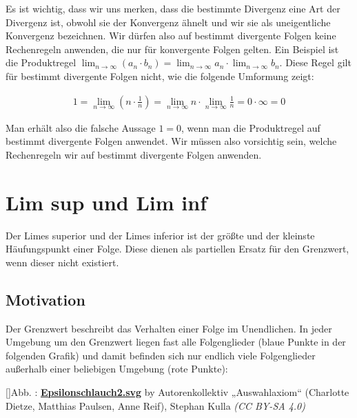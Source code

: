 \documentclass[fontsize=9pt,
               parskip=half-,
               DIV=14,
               listof=chapterentry,
               tocflat]{scrbook}
\newcounter{imagelabel}
\begin{document}
\begin{warning*}
Es ist wichtig, dass wir uns merken, dass die bestimmte Divergenz eine Art der Divergenz ist, obwohl sie der Konvergenz ähnelt und wir sie als uneigentliche Konvergenz bezeichnen. Wir dürfen also auf bestimmt divergente Folgen keine Rechenregeln anwenden, die nur für konvergente Folgen gelten. Ein Beispiel ist die Produktregel $\lim _{n\to \infty }(a_{n}\cdot b_{n})=\lim _{n\to \infty }a_{n}\cdot \lim _{n\to \infty }b_{n}$. Diese Regel gilt für bestimmt divergente Folgen nicht, wie die folgende Umformung zeigt:

\begin{align*}
1=\lim _{n\to \infty }\left(n\cdot {\frac {1}{n}}\right)=\lim _{n\to \infty }n\cdot \lim _{n\to \infty }{\frac {1}{n}}=0\cdot \infty =0
\end{align*}

Man erhält also die falsche Aussage $1=0$, wenn man die Produktregel auf bestimmt divergente Folgen anwendet. Wir müssen also vorsichtig sein, welche Rechenregeln wir auf bestimmt divergente Folgen anwenden. 

\end{warning*}

\chapter{Lim sup und Lim inf}

Der Limes superior und der Limes inferior ist der größte und der kleinste Häufungspunkt einer Folge. Diese dienen als partiellen Ersatz für den Grenzwert, wenn dieser nicht existiert.

\section{Motivation}

Der Grenzwert beschreibt das Verhalten einer Folge im Unendlichen. In jeder Umgebung um den Grenzwert liegen fast alle Folgenglieder (blaue Punkte in der folgenden Grafik) und damit befinden sich nur endlich viele Folgenglieder außerhalb einer beliebigen Umgebung (rote Punkte):

[]{Abb. : \protect\href{https://commons.wikimedia.org/wiki/File:Epsilonschlauch2.svg}{\textbf{Epsilonschlauch2.svg}} by Autorenkollektiv „Auswahlaxiom“ (Charlotte Dietze, Matthias Paulsen, Anne Reif), Stephan Kulla \textit{(CC BY-SA 4.0)}}\begin{center}
\end{center}
\end{document}
